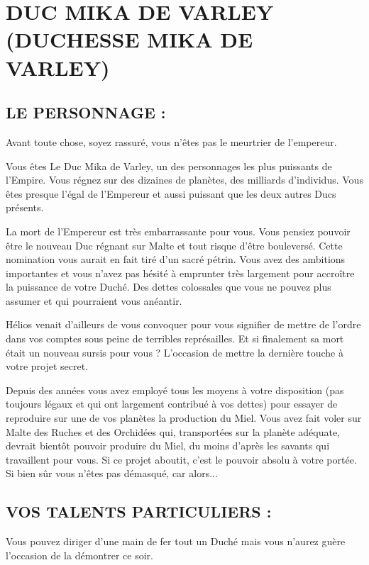 \documentclass[14pt,twocolumn]{extarticle}
\begin{document}
\section{DUC MIKA DE VARLEY\\(DUCHESSE MIKA DE VARLEY)}

\subsection{LE PERSONNAGE :}

Avant toute chose, soyez rassuré, vous n’êtes pas le meurtrier de l'empereur.

Vous êtes Le Duc Mika de Varley, un des personnages les plus puissants de
l’Empire. Vous régnez sur des dizaines de planètes, des milliards d’individus.
Vous êtes presque l’égal de l’Empereur et aussi puissant que les deux autres
Ducs présents.

La mort de l’Empereur est très embarrassante pour vous. Vous pensiez pouvoir
être le nouveau Duc régnant sur Malte et tout risque d’être bouleversé. Cette
nomination vous aurait en fait tiré d’un sacré pétrin. Vous avez des ambitions
importantes et vous n’avez pas hésité à emprunter très largement pour accroître
la puissance de votre Duché. Des dettes colossales que vous ne pouvez plus
assumer et qui pourraient vous anéantir.

Hélios venait d’ailleurs de vous convoquer pour vous signifier de mettre de
l’ordre dans vos comptes sous peine de terribles représailles. Et si
finalement sa mort était un nouveau sursis pour vous ? L’occasion de mettre la
dernière touche à votre projet secret.

Depuis des années vous avez employé tous les moyens à votre disposition
(pas toujours légaux et qui ont largement contribué à vos dettes) pour essayer
de reproduire sur une de vos planètes la production du Miel. Vous avez fait
voler sur Malte des Ruches et des Orchidées qui, transportées sur la planète
adéquate, devrait bientôt pouvoir produire du Miel, du moins d’après les
savants qui travaillent pour vous. Si ce projet aboutit, c’est le pouvoir
absolu à votre portée. Si bien sûr vous n’êtes pas démasqué, car alors...

\subsection{VOS TALENTS PARTICULIERS :}

Vous pouvez diriger d’une main de fer tout un Duché mais vous n’aurez guère
l’occasion de la démontrer ce soir.
\end{document}

